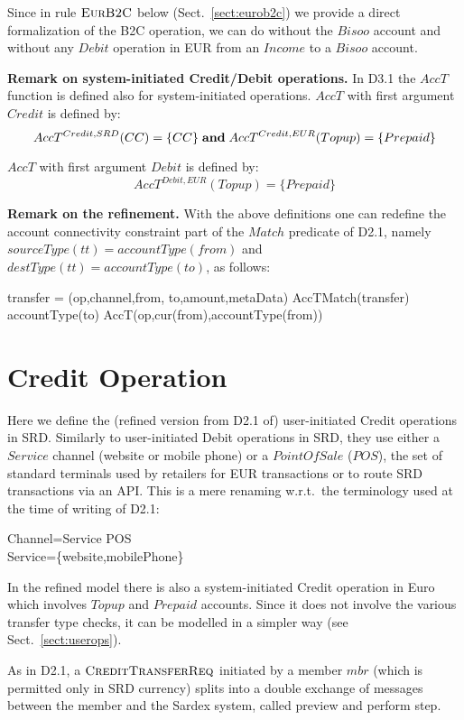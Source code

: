 Since in rule $\hbox{\sc EurB2C}$ below (Sect.~\ref{sect:eurob2c}) we provide a direct formalization of the B2C operation, we can do without the $Bisoo$ account and without any $Debit$ operation in EUR from an $Income$ to a $Bisoo$ account.

{\bf Remark on system-initiated Credit/Debit operations.} In D3.1 the $AccT$ function is defined also for system-initiated operations. $AccT$ with first argument $Credit$ is defined by:
\[AccT^{Credit,SRD}(CC)=\{CC\} \mathrel{\mathbf{and}} AccT^{Credit,EUR}(Topup)=\{Prepaid\} \]

$AccT$ with first argument $Debit$ is defined by:
\[AccT^{Debit,EUR}(Topup)=\{Prepaid\}\]

{\bf Remark on the refinement.} With the above definitions one can redefine the account connectivity constraint part of the $Match$ predicate of D2.1, namely $sourceType(tt)=accountType(from)$ and $destType(tt)=accountType(to)$, as follows:

\begin{asm}
\LET transfer = (op,channel,from, to,amount,metaData) \+
AccTMatch(transfer) \IFF ~~   accountType(to) \in AccT(op,cur(from),accountType(from))
\end{asm}

\section{Credit Operation} 
\label{sect:creditops}

Here we define the (refined version from D2.1 of) user-initiated Credit operations in SRD. Similarly to user-initiated Debit operations in SRD, they use either a $Service$ channel (website or mobile phone) or a $PointOfSale$ ($POS$), the set of standard terminals used by retailers for EUR transactions or to route SRD transactions via an API. This is a mere renaming w.r.t.\ the terminology used at the time of writing of D2.1:
\begin{asm}
Channel=Service \cup POS \\
Service=\{website,mobilePhone\}
\end{asm}

In the refined model there is also a system-initiated Credit operation in Euro which involves $Topup$ and $Prepaid$ accounts. Since it does not involve the various transfer type checks, it can be modelled in a simpler way (see Sect.~\ref{sect:userops}).

As in D2.1, a $\hbox{\sc CreditTransferReq}$ initiated by a member $mbr$ (which is permitted only in SRD currency) splits into a double exchange of messages between the member and the Sardex system, called preview and perform step.

